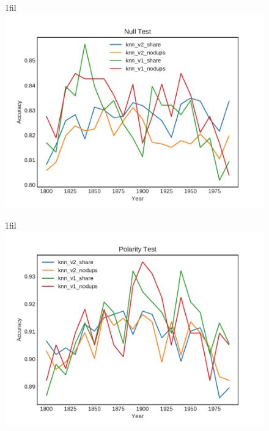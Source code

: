 \documentclass{article}
\makeatletter
\newcommand*{\centerfloat}{%
  \parindent \z@
  \leftskip \z@ \@plus 1fil \@minus \textwidth
  \rightskip\leftskip
  \parfillskip \z@skip}
\makeatother
\begin{document}
\begin{figure}[H]
    \centerfloat
    \includegraphics[width=1.3\linewidth]{../../plots-2/knn/results_null_test.pdf}
\end{figure}

\begin{figure}[H]
    \centerfloat
    \includegraphics[width=1.3\linewidth]{../../plots-2/knn/results_polarity_test.pdf}
\end{figure}
\end{document}
